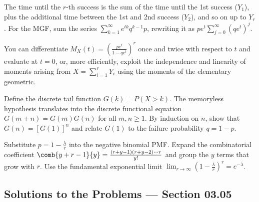 \begin{sugerencia}
	\label{sug:3.5.7}
	The time until the $r$-th success is the sum of the time until the 1st success ($Y_1$), plus the additional time between the 1st and 2nd success ($Y_2$), and so on up to $Y_r$. For the MGF, sum the series $\sum_{k=1}^{\infty} e^{tk} q^{k-1} p$, rewriting it as $p e^t \sum_{j=0}^{\infty} (q e^t)^j$.
\end{sugerencia}

\begin{sugerencia}
	\label{sug:3.5.8}
	You can differentiate $M_X(t) = \left(\frac{p e^t}{1-qe^t}\right)^r$ once and twice with respect to $t$ and evaluate at $t=0$, or, more efficiently, exploit the independence and linearity of moments arising from $X = \sum_{i=1}^r Y_i$ using the moments of the elementary geometric.
\end{sugerencia}

\begin{sugerencia}
	\label{sug:3.5.9}
	Define the discrete tail function $G(k) = P(X > k)$. The memoryless hypothesis translates into the discrete functional equation $G(m+n) = G(m)G(n)$ for all $m, n \ge 1$. By induction on $n$, show that $G(n) = [G(1)]^n$ and relate $G(1)$ to the failure probability $q = 1-p$.
\end{sugerencia}

\begin{sugerencia}
	\label{sug:3.5.10}
	Substitute $p = 1 - \frac{\lambda}{r}$ into the negative binomial PMF. Expand the combinatorial coefficient $\comb{y+r-1}{y} = \frac{(r+y-1)(r+y-2)\cdots r}{y!}$ and group the $y$ terms that grow with $r$. Use the fundamental exponential limit $\lim_{r\to\infty} \left(1 - \frac{\lambda}{r}\right)^r = e^{-\lambda}$.
\end{sugerencia}


\subsection*{Solutions to the Problems --- Section 03.05}

